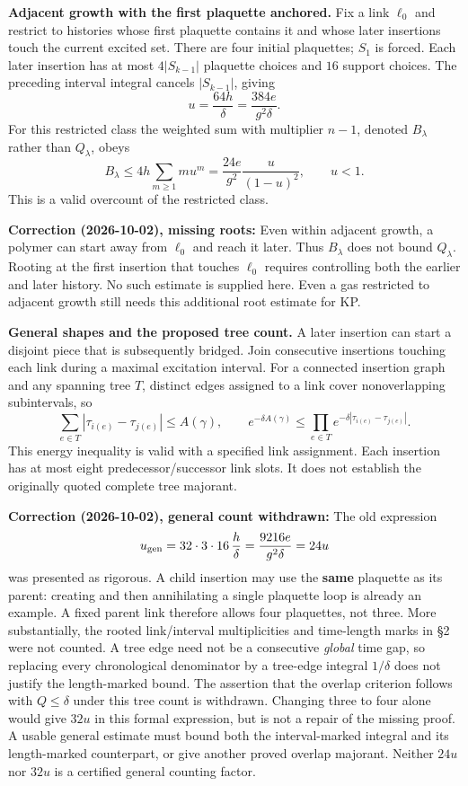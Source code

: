 \documentclass[11pt,a4paper]{article}
\begin{document}
\textbf{Adjacent growth with the first plaquette anchored.} Fix a link
\(\ell_0\) and restrict to histories whose first plaquette contains it
and whose later insertions touch the current excited set. There are four
initial plaquettes; \(S_1\) is forced. Each later insertion has at most
\(4|S_{k-1}|\) plaquette choices and \(16\) support choices. The
preceding interval integral cancels \(|S_{k-1}|\), giving
\[u=\frac{64h}{\delta}=\frac{384e}{g^2\delta}.\] For this restricted
class the weighted sum with multiplier \(n-1\), denoted \(B_\lambda\)
rather than \(Q_\lambda\), obeys \[B_\lambda\le4h\sum_{m\ge1}mu^m
=\frac{24e}{g^2}\frac{u}{(1-u)^2},\qquad u<1.\] This is a valid
overcount of the restricted class.

\textbf{Correction (2026-10-02), missing roots:} Even within adjacent
growth, a polymer can start away from \(\ell_0\) and reach it later.
Thus \(B_\lambda\) does not bound \(Q_\lambda\). Rooting at the first
insertion that touches \(\ell_0\) requires controlling both the earlier
and later history. No such estimate is supplied here. Even a gas
restricted to adjacent growth still needs this additional root estimate
for KP.

\textbf{General shapes and the proposed tree count.} A later insertion
can start a disjoint piece that is subsequently bridged. Join
consecutive insertions touching each link during a maximal excitation
interval. For a connected insertion graph and any spanning tree \(T\),
distinct edges assigned to a link cover nonoverlapping subintervals, so
\[\sum_{e\in T}|\tau_{i(e)}-\tau_{j(e)}|\le A(\gamma),\qquad
e^{-\delta A(\gamma)}\le\prod_{e\in T}e^{-\delta|\tau_{i(e)}-\tau_{j(e)}|}.\]
This energy inequality is valid with a specified link assignment. Each
insertion has at most eight predecessor/successor link slots. It does
not establish the originally quoted complete tree majorant.

\textbf{Correction (2026-10-02), general count withdrawn:} The old
expression \[u_{\rm gen}=32\cdot3\cdot16\,\frac{h}{\delta}
=\frac{9216e}{g^2\delta}=24u\] was presented as rigorous. A child
insertion may use the \textbf{same} plaquette as its parent: creating
and then annihilating a single plaquette loop is already an example. A
fixed parent link therefore allows four plaquettes, not three. More
substantially, the rooted link/interval multiplicities and time-length
marks in §2 were not counted. A tree edge need not be a consecutive
\emph{global} time gap, so replacing every chronological denominator by
a tree-edge integral \(1/\delta\) does not justify the length-marked
bound. The assertion that the overlap criterion follows with
\(Q\le\delta\) under this tree count is withdrawn. Changing three to
four alone would give \(32u\) in this formal expression, but is not a
repair of the missing proof. A usable general estimate must bound both
the interval-marked integral and its length-marked counterpart, or give
another proved overlap majorant. Neither \(24u\) nor \(32u\) is a
certified general counting factor.
\end{document}
